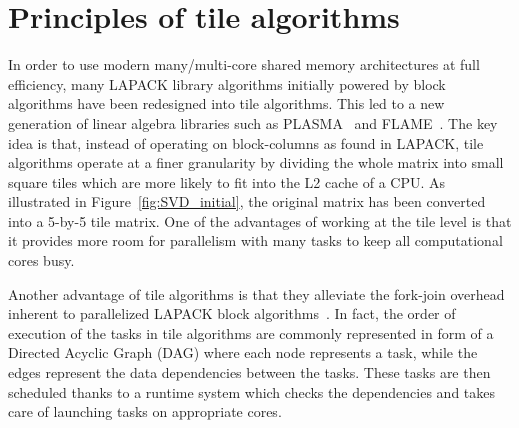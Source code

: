 \section{Principles of tile algorithms}\label{sec:tile}
In order to use modern many/multi-core shared memory architectures at
full efficiency,
many LAPACK library algorithms initially powered by
block algorithms have been redesigned into tile algorithms.
This led to a new generation of linear algebra libraries such as
PLASMA~\cite{DBLP:journals/corr/abs-0709-1272} and FLAME~\cite{FLAWN3}.
The key idea is that,
instead of operating on block-columns as found in LAPACK,
tile algorithms operate at a finer granularity by dividing the whole
matrix into small square tiles which are more likely to fit into the
L2 cache of a CPU.
As illustrated in Figure~\ref{fig:SVD_initial}, the original
matrix has been converted into a 5-by-5 tile matrix.  One of the
advantages of working at the tile level is that it provides more
room for parallelism with many tasks to keep all computational cores
busy.

Another advantage of tile algorithms is that they alleviate
the fork-join overhead inherent to parallelized LAPACK
block algorithms~\cite{haidar2012analysis}.
In fact,
the order of execution of the tasks in tile algorithms are commonly
represented in form of a Directed Acyclic Graph (DAG) where each node
represents a task, while the edges represent the
data dependencies between the tasks.
These tasks are then scheduled
thanks to a runtime system which checks the dependencies and
takes care of launching tasks on appropriate cores.

